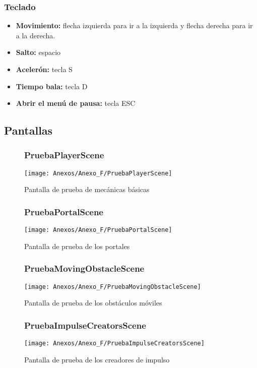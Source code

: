\subsubsection{Teclado}
\begin{itemize}
\item
\textbf{Movimiento:} flecha izquierda para ir a la izquierda y flecha derecha para ir a la derecha.
\item
\textbf{Salto:} espacio 
\item
\textbf{Acelerón:} tecla S
\item
\textbf{Tiempo bala:} tecla D
\item
\textbf{Abrir el menú de pausa:} tecla ESC
\end{itemize}

\subsection{Pantallas}
\begin{figure}[h]
\subsubsection{PruebaPlayerScene}
\centering
\texttt{[image: Anexos/Anexo\_F/PruebaPlayerScene]}
\caption{Pantalla de prueba de mecánicas básicas }
\end{figure}

\begin{figure}[h]
\subsubsection{PruebaPortalScene}
\centering
\texttt{[image: Anexos/Anexo\_F/PruebaPortalScene]}
\caption{Pantalla de prueba de los portales }
\end{figure}

\begin{figure}[h]
\subsubsection{PruebaMovingObstacleScene}
\centering
\texttt{[image: Anexos/Anexo\_F/PruebaMovingObstacleScene]}
\caption{Pantalla de prueba de los obstáculos móviles }
\end{figure}

\begin{figure}[h]
\subsubsection{PruebaImpulseCreatorsScene}
\centering
\texttt{[image: Anexos/Anexo\_F/PruebaImpulseCreatorsScene]}
\caption{Pantalla de prueba de los creadores de impulso }
\end{figure}

